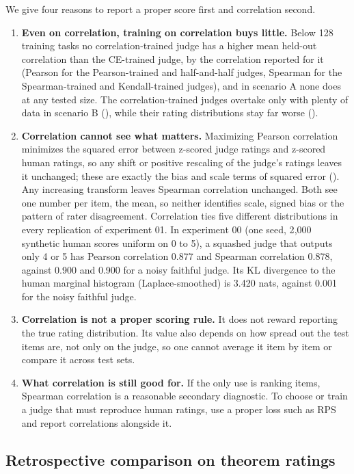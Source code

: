 We give four reasons to report a proper score first and correlation second.
\begin{enumerate}
\item \textbf{Even on correlation, training on correlation buys little.} Below 128 training tasks no correlation-trained judge has a higher mean held-out correlation than the CE-trained judge, by the correlation reported for it (Pearson for the Pearson-trained and half-and-half judges, Spearman for the Spearman-trained and Kendall-trained judges), and in scenario A none does at any tested size. The correlation-trained judges overtake only with plenty of data in scenario B (), while their rating distributions stay far worse ().
\item \textbf{Correlation cannot see what matters.} Maximizing Pearson correlation minimizes the squared error between z-scored judge ratings and z-scored human ratings, so any shift or positive rescaling of the judge's ratings leaves it unchanged; these are exactly the bias and scale terms of squared error (). Any increasing transform leaves Spearman correlation unchanged. Both see one number per item, the mean, so neither identifies scale, signed bias or the pattern of rater disagreement. Correlation ties five different distributions in every replication of experiment 01. In experiment 00 (one seed, 2{,}000 synthetic human scores uniform on 0 to 5), a squashed judge that outputs only 4 or 5 has Pearson correlation 0.877 and Spearman correlation 0.878, against 0.900 and 0.900 for a noisy faithful judge. Its KL divergence to the human marginal histogram (Laplace-smoothed) is 3.420 nats, against 0.001 for the noisy faithful judge.
\item \textbf{Correlation is not a proper scoring rule.} It does not reward reporting the true rating distribution. Its value also depends on how spread out the test items are, not only on the judge, so one cannot average it item by item or compare it across test sets.
\item \textbf{What correlation is still good for.} If the only use is ranking items, Spearman correlation is a reasonable secondary diagnostic. To choose or train a judge that must reproduce human ratings, use a proper loss such as RPS and report correlations alongside it.
\end{enumerate}

\subsection{Retrospective comparison on theorem ratings}
\label{app:controlled-forest}

